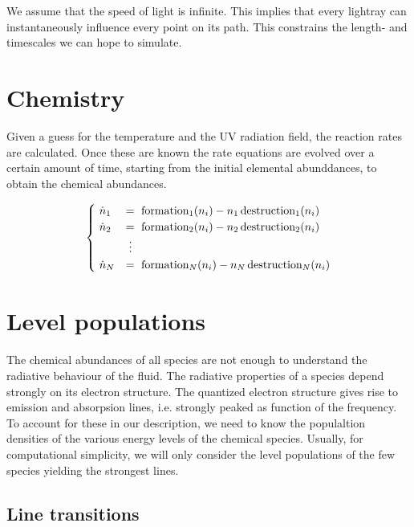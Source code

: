 \documentclass[]{article}
\begin{document}
\bigskip


We assume that the speed of light is infinite. This implies that every lightray can instantaneously influence every point on its path. This constrains the length- and timescales we can hope to simulate.

\section{Chemistry}

Given a guess for the temperature and the UV radiation field, the reaction rates are calculated. Once these are known the rate equations are evolved over a certain amount of time, starting from the initial elemental abunddances, to obtain the chemical abundances.

\begin{equation}
  \begin{cases}
  \ \dot{n}_{1} &= \ \text{formation}_{1}(n_{i}) - n_{1} \, \text{destruction}_{1}(n_{i}) \\
  \ \dot{n}_{2} &= \ \text{formation}_{2}(n_{i}) - n_{2} \, \text{destruction}_{2}(n_{i}) \\
  & \hspace{1mm} \vdots \\
  \ \dot{n}_{N} &= \ \text{formation}_{N}(n_{i}) - n_{N} \, \text{destruction}_{N}(n_{i})
  \end{cases}
\end{equation}

\section{Level populations}

The chemical abundances of all species are not enough to understand the radiative behaviour of the fluid. The radiative properties of a species depend strongly on its electron structure. The quantized electron structure gives rise to emission and absorpsion lines, i.e. strongly peaked as function of the frequency. To account for these in our description, we need to know the populaltion densities of the various energy levels of the chemical species. Usually, for computational simplicity, we will only consider the level populations of the few species yielding the strongest lines.

\subsection{Line transitions}
\end{document}
